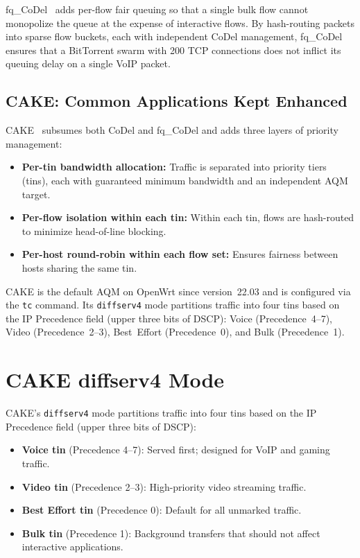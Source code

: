 fq\_CoDel~\cite{hoeiland2018} adds per-flow fair queuing so that a single bulk flow cannot monopolize the queue at the expense of interactive flows. By hash-routing packets into sparse flow buckets, each with independent CoDel management, fq\_CoDel ensures that a BitTorrent swarm with 200 TCP connections does not inflict its queuing delay on a single VoIP packet.

\subsection{CAKE: Common Applications Kept Enhanced}

CAKE~\cite{cake2018} subsumes both CoDel and fq\_CoDel and adds three layers of priority management:
\begin{itemize}
  \item \textbf{Per-tin bandwidth allocation:} Traffic is separated into priority tiers (tins), each with guaranteed minimum bandwidth and an independent AQM target.
  \item \textbf{Per-flow isolation within each tin:} Within each tin, flows are hash-routed to minimize head-of-line blocking.
  \item \textbf{Per-host round-robin within each flow set:} Ensures fairness between hosts sharing the same tin.
\end{itemize}

CAKE is the default AQM on OpenWrt since version~22.03 and is configured via the \texttt{tc} command. Its \texttt{diffserv4} mode partitions traffic into four tins based on the IP Precedence field (upper three bits of DSCP): Voice (Precedence~4--7), Video (Precedence~2--3), Best~Effort (Precedence~0), and Bulk (Precedence~1).

\section{CAKE diffserv4 Mode}

CAKE's \texttt{diffserv4} mode partitions traffic into four tins based on the IP Precedence field (upper three bits of DSCP):

\begin{itemize}
  \item \textbf{Voice tin} (Precedence 4--7): Served first; designed for VoIP and gaming traffic.
  \item \textbf{Video tin} (Precedence 2--3): High-priority video streaming traffic.
  \item \textbf{Best Effort tin} (Precedence 0): Default for all unmarked traffic.
  \item \textbf{Bulk tin} (Precedence 1): Background transfers that should not affect interactive applications.
\end{itemize}


